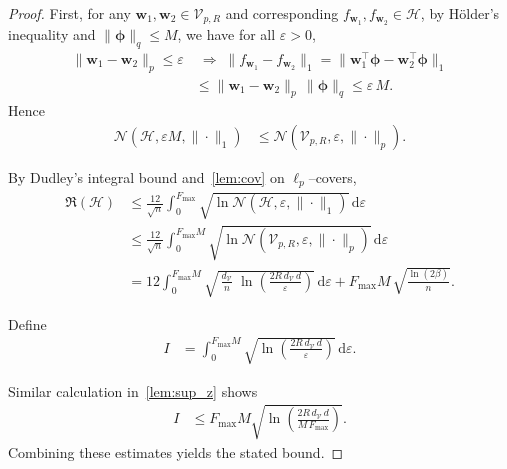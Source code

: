 \documentclass{article}
\theoremstyle{plain}
\theoremstyle{definition}
\theoremstyle{remark}
\begin{document}
\begin{proof}
First, for any $\bm w_1,\bm w_2\in\mathcal{V}_{p,R}$ and corresponding $f_{\bm w_1},f_{\bm w_2}\in\mathcal{H}$, by Hölder’s inequality and $\|\bm\phi\|_{q}\le M$, we have for all $\varepsilon>0$,
\begin{align*}
\|\bm w_1-\bm w_2\|_{p}\le\varepsilon
&\;\Longrightarrow\;
\|f_{\bm w_1}-f_{\bm w_2}\|_{1}
=\|\bm w_1^{\top}\bm\phi - \bm w_2^{\top}\bm\phi\|_{1}\\
&\le
\|\bm w_1-\bm w_2\|_{p}\,\|\bm\phi\|_{q}
\le\varepsilon\,M.
\end{align*}
Hence
\begin{align*}
\mathcal{N}\left(\mathcal{H},\varepsilon M,\|\cdot\|_{1}\right)
&\le
\mathcal{N}\left(\mathcal{V}_{p,R},\varepsilon,\|\cdot\|_{p}\right).
\end{align*}

By Dudley’s integral bound and~\cref{lem:cov} on $\ell_{p}$–covers,
\begin{align*}
\mathfrak{R}(\mathcal{H})
&\le
\frac{12}{\sqrt{n}}
\int_{0}^{F_{\max}}
  \sqrt{\ln\mathcal{N}\left(\mathcal{H},\varepsilon,\|\cdot\|_{1}\right)}
\,\mathrm{d}\varepsilon\\
&\le
\frac{12}{\sqrt{n}}
\int_{0}^{F_{\max}M}
  \sqrt{\ln\mathcal{N}\left(\mathcal{V}_{p,R},\varepsilon,\|\cdot\|_{p}\right)}
\,\mathrm{d}\varepsilon\\
&=
12
\int_{0}^{F_{\max}M}
  \sqrt{\,\frac{d_{\mathcal{V}}}{n}\;\ln\left(\frac{2R\,d_{\mathcal{V}}\,d}{\varepsilon}\right)}
\,\mathrm{d}\varepsilon
+F_{\max}M\,\sqrt{\frac{\ln(2\beta)}{n}}.
\end{align*}

Define
\begin{align*}
I
&=
\int_{0}^{F_{\max}M}
  \sqrt{\ln\left(\frac{2R\,d_{\mathcal{V}}\,d}{\varepsilon}\right)}
\,\mathrm{d}\varepsilon.
\end{align*}

Similar calculation in~\cref{lem:sup_z} shows
\begin{align*}
I
&\le
F_{\max}M
\sqrt{\ln\left(\frac{2R\,d_{\mathcal{V}}\,d}{M\,F_{\max}}\right)}.
\end{align*}
Combining these estimates yields the stated bound.
\end{proof}
\end{document}
